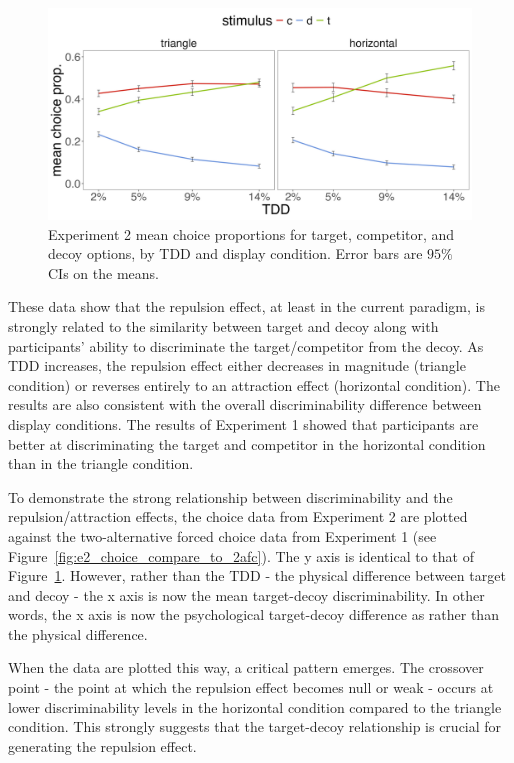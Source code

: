 \begin{figure}
   \includegraphics[width=\textwidth]{figures/choicePhase_att_trials_mean_choice_props_collapsed.jpg}
   \caption{Experiment 2 mean choice proportions for target, competitor, and decoy options, by TDD and display condition. Error bars are $95\%$ CIs on the means.}
   \label{fig:e2_choiceprops}
\end{figure}

These data show that the repulsion effect, at least in the current paradigm, is strongly related to the similarity between target and decoy along with participants' ability to discriminate the target/competitor from the decoy. As TDD increases, the repulsion effect either decreases in magnitude (triangle condition) or reverses entirely to an attraction effect (horizontal condition). The results are also consistent with the overall discriminability difference between display conditions. The results of Experiment 1 showed that participants are better at discriminating the target and competitor in the horizontal condition than in the triangle condition. 

To demonstrate the strong relationship between discriminability and the repulsion/attraction effects, the choice data from Experiment 2 are plotted against the two-alternative forced choice data from Experiment 1 (see Figure~\ref{fig:e2_choice_compare_to_2afc}). The y axis is identical to that of Figure~\ref{fig:e2_choiceprops}. However, rather than the TDD - the physical difference between target and decoy - the x axis is now the mean target-decoy discriminability. In other words, the x axis is now the psychological target-decoy difference as rather than the physical difference. 

When the data are plotted this way, a critical pattern emerges. The crossover point - the point at which the repulsion effect becomes null or weak - occurs at lower discriminability levels in the horizontal condition compared to the triangle condition. This strongly suggests that the target-decoy relationship is crucial for generating the repulsion effect.

